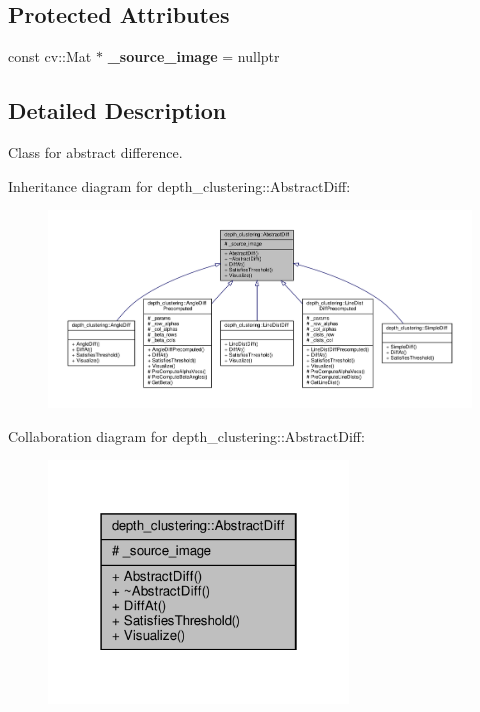 \subsection*{Protected Attributes}
\begin{DoxyCompactItemize}
\item 
\mbox{\label{classdepth__clustering_1_1AbstractDiff_ac554e78b6f29341d1361a8ec6932698a}} 
const cv\+::\+Mat $\ast$ {\bfseries \+\_\+source\+\_\+image} = nullptr
\end{DoxyCompactItemize}


\subsection{Detailed Description}
Class for abstract difference. 

Inheritance diagram for depth\+\_\+clustering\+:\+:Abstract\+Diff\+:\nopagebreak
\begin{figure}[H]
\begin{center}
\leavevmode
\includegraphics[width=350pt]{classdepth__clustering_1_1AbstractDiff__inherit__graph}
\end{center}
\end{figure}


Collaboration diagram for depth\+\_\+clustering\+:\+:Abstract\+Diff\+:\nopagebreak
\begin{figure}[H]
\begin{center}
\leavevmode
\includegraphics[width=226pt]{classdepth__clustering_1_1AbstractDiff__coll__graph}
\end{center}
\end{figure}



